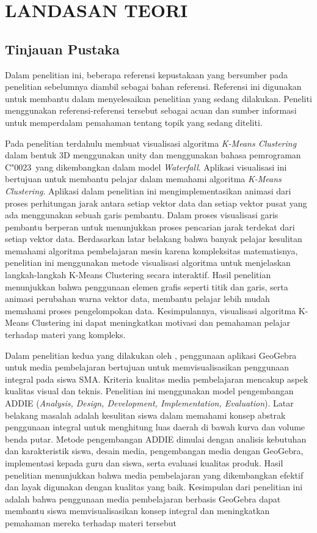 \chapter{LANDASAN TEORI}
\section{Tinjauan Pustaka}
Dalam penelitian ini, beberapa referensi kepustakaan yang bersumber pada penelitian sebelumnya diambil sebagai bahan referensi. Referensi ini digunakan untuk membantu dalam menyelesaikan penelitian yang sedang dilakukan. Peneliti menggunakan referensi-referensi tersebut sebagai acuan dan sumber informasi untuk memperdalam pemahaman tentang topik yang sedang diteliti.

Pada penelitian terdahulu \textcite{suryadibrata2020visualisasi} membuat visualisasi algoritma \textit{K-Means Clustering} dalam bentuk 3D menggunakan unity dan menggunakan bahasa pemrograman C\char"0023\ yang dikembangkan dalam model \textit{Waterfall}. Aplikasi visualisasi ini bertujuan untuk membantu pelajar dalam memahami algoritma \textit{K-Means Clustering}. Aplikasi dalam penelitian ini mengimplementasikan animasi dari proses perhitungan jarak antara setiap vektor data dan setiap vektor pusat yang ada menggunakan sebuah garis pembantu. Dalam proses visualisasi garis pembantu berperan untuk menunjukkan proses pencarian jarak terdekat dari setiap vektor data. Berdasarkan latar belakang bahwa banyak pelajar kesulitan memahami algoritma pembelajaran mesin karena kompleksitas matematisnya, penelitian ini menggunakan metode visualisasi algoritma untuk menjelaskan langkah-langkah K-Means Clustering secara interaktif. Hasil penelitian menunjukkan bahwa penggunaan elemen grafis seperti titik dan garis, serta animasi perubahan warna vektor data, membantu pelajar lebih mudah memahami proses pengelompokan data. Kesimpulannya, visualisasi algoritma K-Means Clustering ini dapat meningkatkan motivasi dan pemahaman pelajar terhadap materi yang kompleks.

Dalam penelitian kedua yang dilakukan oleh \textcite{zarkasyi2015pengembangan}, penggunaan aplikasi GeoGebra untuk media pembelajaran bertujuan untuk memvisualisasikan penggunaan integral pada siswa SMA. Kriteria kualitas media pembelajaran mencakup aspek kualitas visual dan teknis. Penelitian ini menggunakan model pengembangan ADDIE (\textit{Analysis, Design, Development, Implementation, Evaluation}). Latar belakang masalah adalah kesulitan siswa dalam memahami konsep abstrak penggunaan integral untuk menghitung luas daerah di bawah kurva dan volume benda putar. Metode pengembangan ADDIE dimulai dengan analisis kebutuhan dan karakteristik siswa, desain media, pengembangan media dengan GeoGebra, implementasi kepada guru dan siswa, serta evaluasi kualitas produk. Hasil penelitian menunjukkan bahwa media pembelajaran yang dikembangkan efektif dan layak digunakan dengan kualitas yang baik. Kesimpulan dari penelitian ini adalah bahwa penggunaan media pembelajaran berbasis GeoGebra dapat membantu siswa memvisualisasikan konsep integral dan meningkatkan pemahaman mereka terhadap materi tersebut

